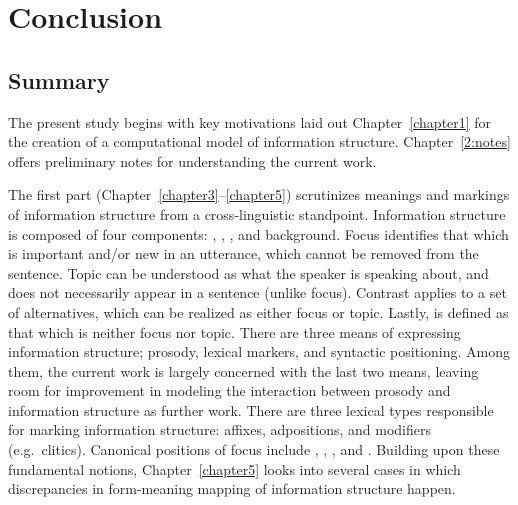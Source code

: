 \chapter{Conclusion}
\label{chapter15}
\setcounter{enums}{0}

\section{Summary}
\label{15:sec:summary}


The present study begins with key motivations laid out
Chapter~\ref{chapter1} for the creation of a computational model of
information structure. Chapter~\ref{2:notes} offers preliminary notes
for understanding the current work.

The first part (Chapter~\ref{chapter3}--\ref{chapter5}) scrutinizes
meanings and markings of information structure from a cross-linguistic
standpoint. Information structure is composed of four components:
, , , and background. Focus identifies that which is
important and/or new in an utterance, which cannot be removed from the
sentence. Topic can be understood as what the speaker is speaking
about, and does not necessarily appear in a sentence (unlike
focus). Contrast applies to a set of alternatives,
which can be realized as either focus or topic. Lastly,
 is defined as that which is neither focus nor
topic. There are three means of expressing information structure;
prosody, lexical markers, and
syntactic positioning. Among them, the
current work is largely concerned with the last two means, leaving
room for improvement in modeling the interaction between prosody and
information structure as further work.  There are three lexical types
responsible for marking information structure: affixes, adpositions,
and modifiers (e.g.\ clitics). Canonical positions of
focus include , ,
, and . Building upon these fundamental
notions, Chapter~\ref{chapter5} looks into several cases in which
discrepancies in form-meaning mapping of information structure happen.


